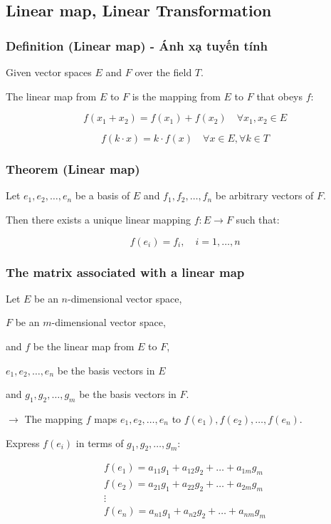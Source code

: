 \subsection{Linear map, Linear Transformation}
\subsubsection{Definition (Linear map) - Ánh xạ tuyến tính}

Given vector spaces $E$ and $F$ over the field $T$.

The linear map from $E$ to $F$ is the mapping from $E$ to $F$ that obeys $f$:

\[
f(x_1 + x_2) = f(x_1) + f(x_2) \quad \forall x_1, x_2 \in E
\]

\[
f(k \cdot x) = k \cdot f(x) \quad \forall x \in E, \forall k \in T
\]

\subsubsection{Theorem (Linear map)}

Let $e_1, e_2, \ldots, e_n$ be a basis of $E$ and $f_1, f_2, \ldots, f_n$ be arbitrary vectors of $F$.

Then there exists a unique linear mapping $f: E \to F$ such that:

\[
f(e_i) = f_i, \quad i = 1, \ldots, n
\]

\subsubsection{The matrix associated with a linear map}

Let $E$ be an $n$-dimensional vector space, 

$F$ be an $m$-dimensional vector space, 

and $f$ be the linear map from $E$ to $F$, 

$e_1, e_2, \ldots, e_n$ be the basis vectors in $E$ 

and $g_1, g_2, \ldots, g_m$ be the basis vectors in $F$.

$\rightarrow$ The mapping $f$ maps $e_1, e_2, \ldots, e_n$ to $f(e_1), f(e_2), \ldots, f(e_n)$.

Express $f(e_i)$ in terms of $g_1, g_2, \ldots, g_m$:

\begin{equation*}
    \begin{matrix}
        f(e_1) = a_{11} g_1 + a_{12} g_2 + \ldots + a_{1m} g_m\\
        f(e_2) = a_{21} g_1 + a_{22} g_2 + \ldots + a_{2m} g_m\\
        \vdots\\
        f(e_n) = a_{n1} g_1 + a_{n2} g_2 + \ldots + a_{nm} g_m
    \end{matrix}
\end{equation*}

